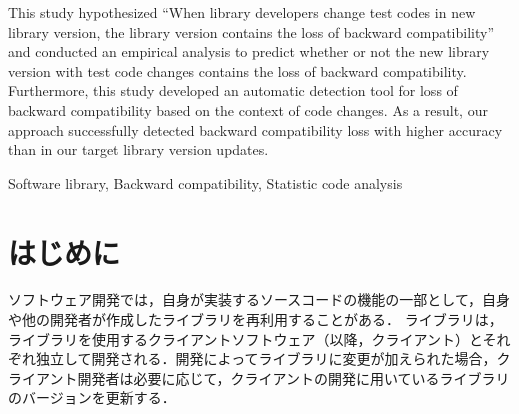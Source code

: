 \documentclass[submit]{ipsj}
\begin{document}
\begin{eabstract}
This study hypothesized ``When library developers change test codes in new library version, the library version contains the loss of backward compatibility'' and conducted an empirical analysis to predict whether or not the new library version with test code changes contains the loss of backward compatibility. Furthermore, this study developed an automatic detection tool for loss of backward compatibility based on the context of code changes. As a result, our approach successfully detected backward compatibility loss with higher accuracy than \textcolor{red}{} in our target library version updates.
\end{eabstract}

\begin{ekeyword}
Software library, Backward compatibility, Statistic code analysis
\end{ekeyword}

\maketitle

\section{はじめに}

ソフトウェア開発では，自身が実装するソースコードの機能の一部として，自身や他の開発者が作成したライブラリを再利用することがある．
ライブラリは，ライブラリを使用するクライアントソフトウェア（以降，クライアント）とそれぞれ独立して開発される．開発によってライブラリに変更が加えられた場合，クライアント開発者は必要に応じて，クライアントの開発に用いているライブラリのバージョンを更新する．
\end{document}
